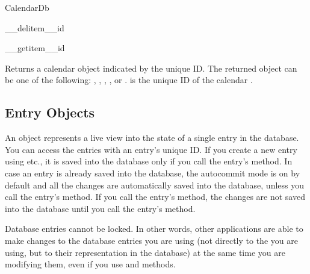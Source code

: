 \begin{classdesc*}{CalendarDb}
\begin{methoddesc}[CalendarDb]{__delitem__}{id}
\end{methoddesc}

\begin{methoddesc}[CalendarDb]{__getitem__}{id}

Returns a calendar  object indicated by the unique ID. The returned 
object can be one of the following: , 
, , , 
or .  is the unique ID of the calendar . 

\end{methoddesc}

\end{classdesc*}

\subsection{Entry Objects}
\label{subsec:entry}

An  object represents a live view into the state of a single 
entry in the database. You can access the entries with an entry's unique ID. 
If you create a new entry using  etc., it is 
saved into the database only if you call the entry's  method. 
In case an entry is already saved into the database, the autocommit mode is 
on by default and all the changes are automatically saved into the database, 
unless you call the entry's  method. If you call the entry's 
 method, the changes are not saved into the database until you 
call the entry's  method. 

Database entries cannot be locked. In other words, other applications are 
able to make changes to the database entries you are using (not directly to 
the  you are using, but to their representation in the 
database) at the same time you are modifying them, even if you use 
 and  methods. 

